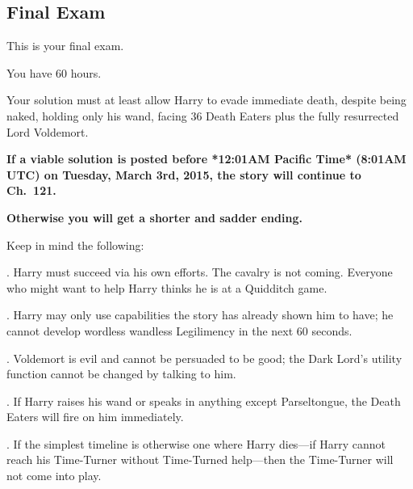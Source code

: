 \subsection{\textbf{Final Exam}}

\noindent
This is your final exam.

\vspace*{.5\baselineskip}\noindent
You have 60 hours.

\vspace*{.5\baselineskip}\noindent
Your solution must at least allow Harry to evade immediate death,
despite being naked, holding only his wand, facing 36 Death Eaters
plus the fully resurrected Lord Voldemort.

\vspace*{.5\baselineskip}\noindent
\textbf{If a viable solution is posted before
*12:01AM Pacific Time* (8:01AM UTC) on Tuesday, March 3rd, 2015,
the story will continue to Ch.~121.}

\vspace*{.5\baselineskip}\noindent
\textbf{Otherwise you will get a shorter and sadder ending.}

\vspace*{.5\baselineskip}\noindent
Keep in mind the following:

\vspace*{.5\baselineskip}. Harry must succeed via his own efforts. The cavalry is not coming.
Everyone who might want to help Harry thinks he is at a Quidditch game.

\vspace*{.5\baselineskip}. Harry may only use capabilities the story has already shown him to
have;
he cannot develop wordless wandless Legilimency in the next 60 seconds.

\vspace*{.5\baselineskip}. Voldemort is evil and cannot be persuaded to be good;
the Dark Lord's utility function cannot be changed by talking to him.

\vspace*{.5\baselineskip}. If Harry raises his wand or speaks in anything except Parseltongue,
the Death Eaters will fire on him immediately.

\vspace*{.5\baselineskip}. If the simplest timeline is otherwise one where Harry dies---if 
Harry cannot reach his Time-Turner without Time-Turned help---then 
the Time-Turner will not come into play.

